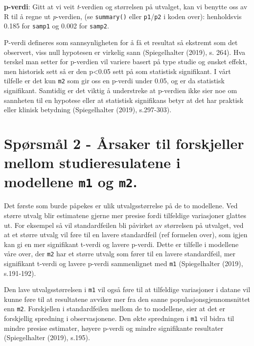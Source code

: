 \documentclass[
  letterpaper,
  DIV=11,
  numbers=noendperiod]{scrreprt}
\begin{document}
\textbf{p-verdi}: Gitt at vi veit \emph{t}-verdien og størrelsen på
utvalget, kan vi benytte oss av R til å regne ut \emph{p}-verdien, (se
\texttt{summary()} eller \texttt{p1}/\texttt{p2} i koden over):
henholdsvis 0.185 for \texttt{samp1} og 0.002 for \texttt{samp2}.

P-verdi defineres som sannsynligheten for å få et resultat så ekstremt
som det observert, viss null hypotesen er virkelig sann (Spiegelhalter
(2019), s. 264). Hva terskel man setter for p-verdien vil variere basert
på type studie og ønsket effekt, men historisk sett så er den
p\textless0.05 sett på som statistisk signifikant. I vårt tilfelle er
det kun \texttt{m2} som gir oss en p-verdi under 0.05, og er da
statistisk signifikant. Samtidig er det viktig å understreke at
p-verdien ikke sier noe om sannheten til en hypotese eller at statistisk
signifikans betyr at det har praktisk eller klinisk betydning
(Spiegelhalter (2019), s.297-303).

\section{\texorpdfstring{Spørsmål 2 - Årsaker til forskjeller mellom
studieresulatene i modellene \texttt{m1} og
\texttt{m2}.}{Spørsmål 2 - Årsaker til forskjeller mellom studieresulatene i modellene m1 og m2.}}\label{spuxf8rsmuxe5l-2---uxe5rsaker-til-forskjeller-mellom-studieresulatene-i-modellene-m1-og-m2.}

Det første som burde påpekes er ulik utvalgsstørrelse på de to
modellene. Ved større utvalg blir estimatene gjerne mer presise fordi
tilfeldige variasjoner glattes ut. For eksempel så vil standardfeilen
bli påvirket av størrelsen på utvalget, ved at et større utvalg vil føre
til en lavere standardfeil (ref formelen over), som igjen kan gi en mer
signifikant t-verdi og lavere p-verdi. Dette er tilfelle i modellene
våre over, der \texttt{m2} har et større utvalg som fører til en lavere
standardfeil, mer signifikant t-verdi og lavere p-verdi sammenlignet med
\texttt{m1} (Spiegelhalter (2019), s.191-192).

Den lave utvalgsstørrelsen i \texttt{m1} vil også føre til at tilfeldige
variasjoner i datane vil kunne føre til at resultatene avviker mer fra
den sanne populasjonsgjennomsnittet enn \texttt{m2}. Forskjellen i
standardfeilen mellom de to modellene, sier at det er forskjellig
spredning i observasjonene. Den økte spredningen i \texttt{m1} vil bidra
til mindre presise estimater, høyere p-verdi og mindre signifikante
resultater (Spiegelhalter (2019), s.195).
\end{document}
